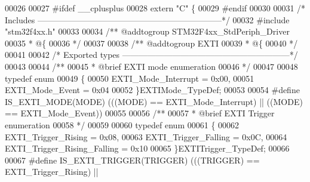 \begin{DoxyCode}
00026 
00027 \textcolor{preprocessor}{#}\textcolor{preprocessor}{ifdef} \_\_cplusplus
00028  \textcolor{keyword}{extern} \textcolor{stringliteral}{"C"} \{
00029 \textcolor{preprocessor}{#}\textcolor{preprocessor}{endif}
00030 
00031 \textcolor{comment}{/* Includes ------------------------------------------------------------------*/}
00032 \textcolor{preprocessor}{#}\textcolor{preprocessor}{include} "stm32f4xx.h"
00033 
00034 \textcolor{comment}{/** @addtogroup STM32F4xx\_StdPeriph\_Driver}
00035 \textcolor{comment}{  * @\{}
00036 \textcolor{comment}{  */}
00037 
00038 \textcolor{comment}{/** @addtogroup EXTI}
00039 \textcolor{comment}{  * @\{}
00040 \textcolor{comment}{  */}
00041 
00042 \textcolor{comment}{/* Exported types ------------------------------------------------------------*/}
00043 
00044 \textcolor{comment}{/** }
00045 \textcolor{comment}{  * @brief  EXTI mode enumeration  }
00046 \textcolor{comment}{  */}
00047 
00048 \textcolor{keyword}{typedef} \textcolor{keyword}{enum}
00049 \{
00050   EXTI_Mode_Interrupt = 0x00,
00051   EXTI_Mode_Event = 0x04
00052 \}EXTIMode\_TypeDef;
00053 
00054 \textcolor{preprocessor}{#}\textcolor{preprocessor}{define} \textcolor{preprocessor}{IS\_EXTI\_MODE}\textcolor{preprocessor}{(}\textcolor{preprocessor}{MODE}\textcolor{preprocessor}{)} \textcolor{preprocessor}{(}\textcolor{preprocessor}{(}\textcolor{preprocessor}{(}\textcolor{preprocessor}{MODE}\textcolor{preprocessor}{)} \textcolor{preprocessor}{==} \textcolor{preprocessor}{EXTI\_Mode\_Interrupt}\textcolor{preprocessor}{)} \textcolor{preprocessor}{||} \textcolor{preprocessor}{(}\textcolor{preprocessor}{(}\textcolor{preprocessor}{MODE}\textcolor{preprocessor}{)} \textcolor{preprocessor}{==} \textcolor{preprocessor}{EXTI\_Mode\_Event}\textcolor{preprocessor}{)}\textcolor{preprocessor}{)}
00055 
00056 \textcolor{comment}{/** }
00057 \textcolor{comment}{  * @brief  EXTI Trigger enumeration  }
00058 \textcolor{comment}{  */}
00059 
00060 \textcolor{keyword}{typedef} \textcolor{keyword}{enum}
00061 \{
00062   EXTI_Trigger_Rising = 0x08,
00063   EXTI_Trigger_Falling = 0x0C,
00064   EXTI_Trigger_Rising_Falling = 0x10
00065 \}EXTITrigger\_TypeDef;
00066 
00067 \textcolor{preprocessor}{#}\textcolor{preprocessor}{define} \textcolor{preprocessor}{IS\_EXTI\_TRIGGER}\textcolor{preprocessor}{(}\textcolor{preprocessor}{TRIGGER}\textcolor{preprocessor}{)} \textcolor{preprocessor}{(}\textcolor{preprocessor}{(}\textcolor{preprocessor}{(}\textcolor{preprocessor}{TRIGGER}\textcolor{preprocessor}{)} \textcolor{preprocessor}{==} \textcolor{preprocessor}{EXTI\_Trigger\_Rising}\textcolor{preprocessor}{)} \textcolor{preprocessor}{||}

\end{DoxyCode}

